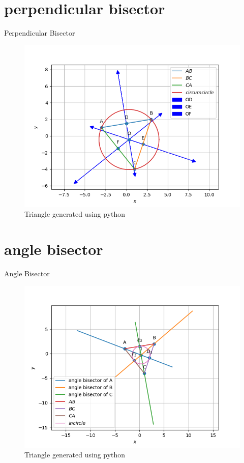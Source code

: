 \documentclass[journal,12pt,onecolumn]{IEEEtran}
\theoremstyle{remark}
\begin{document}
\begin{table}[!ht]
	\section{perpendicular bisector}
	\centering
	
	\caption{Perpendicular Bisector}
	\label{table:Perpendicular Bisector}
\end{table}
\begin{figure}
\includegraphics[width=\columnwidth]{./figs/Q1.4.1.png}
\caption{Triangle generated using python}
\label{fig:perpendicular bisector}
\end{figure}
\begin{table}[!ht]
	\section{angle bisector}
	\centering
	
	\caption{Angle Bisector}
	\label{table:Angle Bisector}
\end{table}
\begin{figure}
\includegraphics[width=\columnwidth]{./figs/Q1.5.1.png}
\caption{Triangle generated using python}
\label{fig:angle bisector}
\end{figure}
\end{document}
